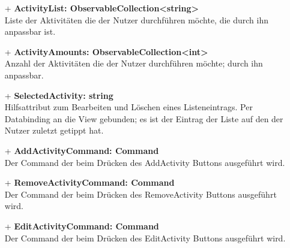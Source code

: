 \documentclass[a4paper,12pt]{article}
\begin{document}
\begin{itemize}
	\item[+] \textbf{ActivityList: ObservableCollection<string>} \\ Liste der Aktivitäten die der Nutzer durchführen möchte, die durch ihn anpassbar ist. 
	\item[+] \textbf{ActivityAmounts: ObservableCollection<int>} \\ Anzahl der Aktivitäten die der Nutzer durchführen möchte; durch ihn anpassbar. 
	\item[+] \textbf{SelectedActivity: string} \\ Hilfsattribut zum Bearbeiten und Löschen eines Listeneintrags. Per Databinding an die View gebunden; es ist der Eintrag der Liste auf den der Nutzer zuletzt getippt hat. 
	\item[+] \textbf{AddActivityCommand: Command} \\ Der Command der beim Drücken des AddActivity Buttons ausgeführt wird. 
	\item[+] \textbf{RemoveActivityCommand: Command} \\ Der Command der beim Drücken des RemoveActivity Buttons ausgeführt wird. 
	\item[+] \textbf{EditActivityCommand: Command} \\ Der Command der beim Drücken des EditActivity Buttons ausgeführt wird. 
\end{itemize}
\end{document}
